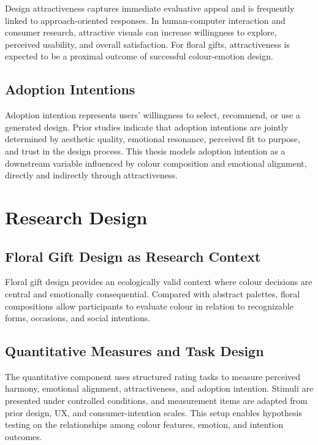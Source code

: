 Design attractiveness captures immediate evaluative appeal and is frequently linked to approach-oriented responses. In human-computer interaction and consumer research, attractive visuals can increase willingness to explore, perceived usability, and overall satisfaction. For floral gifts, attractiveness is expected to be a proximal outcome of successful colour-emotion design.

\subsection{Adoption Intentions}

Adoption intention represents users' willingness to select, recommend, or use a generated design. Prior studies indicate that adoption intentions are jointly determined by aesthetic quality, emotional resonance, perceived fit to purpose, and trust in the design process. This thesis models adoption intention as a downstream variable influenced by colour composition and emotional alignment, directly and indirectly through attractiveness.

\section{Research Design}

\subsection{Floral Gift Design as Research Context}

Floral gift design provides an ecologically valid context where colour decisions are central and emotionally consequential. Compared with abstract palettes, floral compositions allow participants to evaluate colour in relation to recognizable forms, occasions, and social intentions.

\subsection{Quantitative Measures and Task Design}

The quantitative component uses structured rating tasks to measure perceived harmony, emotional alignment, attractiveness, and adoption intention. Stimuli are presented under controlled conditions, and measurement items are adapted from prior design, UX, and consumer-intention scales. This setup enables hypothesis testing on the relationships among colour features, emotion, and intention outcomes.

